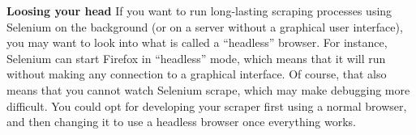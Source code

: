

\begin{feature}\textbf{Loosing your head}
If you want to run long-lasting scraping processes using Selenium on
the background (or on a server without a graphical user interface),
you may want to look into what is called a ``headless'' browser. For
instance, Selenium can start Firefox in ``headless'' mode, which means
that it will run without making any connection to a graphical
interface. Of course, that also means that you cannot watch Selenium
scrape, which may make debugging more difficult. You could opt for
developing your scraper first using a normal browser, and then
changing it to use a headless browser once everything works.
\end{feature}
